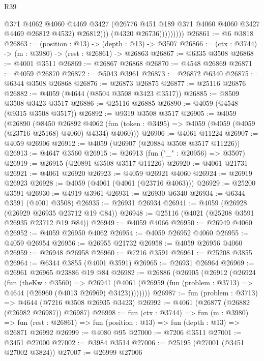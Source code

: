 \begin{lexlean}{R39}
\begin{coremodule}
                          @371
                          @4062
                          @4060
                          @4469
                          @3427
                          (@26776 @451 @189 @371 @4060 @4060 @3427 @4469 @26812 @4532)
                          @26812)))
                    (@4320 @26736)))))))))
@26861 := @6 @3818
@26863 := (position : @13) -> (depth : @13) -> @3507
@26866 := (ctx : @3744) -> (m : @3980) -> (rest : @26861) -> @26863
@26867 := @6335 @3508
@26868 := @4001 @3511
@26869 := @26867 @26868
@26870 := @4548 @26869
@26871 := @4059 @26870
@26872 := @5043 @3961
@26873 := @26872 @6340
@26875 := @6344 @3508 @26868
@26876 := @26873 @26875
@26877 := @25116 @26876
@26882 := @4059 (@4644 (@8504 @3508 @3423 @3517))
@26885 := @8509 @3508 @3423 @3517
@26886 := @25116 @26885
@26890 := @4059 (@4548 (@9315 @3508 @3517))
@26892 := @9319 @3508 @3517
@26905 := @4059
    (@26890
      (@8450
        @26892
        @4062
        (fun (token : @3495) => @4059 (@4059 (@4059 (@23716 @25168) @4060) @4334) @4060)))
@26906 := @4061 @11224
@26907 := @4059 @26906
@26912 := @4059 (@26907 (@20884 @3508 @3517 @11226))
@26913 := @4647 @3560
@26915 := @26913 (fun ("_" : @20956) => @3507)
@26919 := @26915 (@20891 @3508 @3517 @11226)
@26920 := @4061 @21731
@26921 := @4061 @26920
@26923 := @4059 @26921 @4060
@26924 := @26919 @26923
@26928 := @4059 (@4061 (@4061 (@23716 @4063)))
@26929 := @25200 @3591
@26930 := @4919 @3961
@26931 := @26930 @6340
@26934 := @6344 @3591 (@4001 @3508)
@26935 := @26931 @26934
@26941 := @4059 (@26928 (@26929 @26935 @23712 @19 @84))
@26948 := @25116 (@4021 (@25208 @3591 @26935 @23712 @19 @84))
@26949 := @4059 @4066
@26950 := @26949 @4060
@26952 := @4059 @26950 @4062
@26954 := @4059 @26952 @4060
@26955 := @4059 @26954
@26956 := @26955 @21732
@26958 := @4059 @26956 @4060
@26959 := @26948 @26958
@26960 := @7216 @3591
@26961 := @25208 @3855
@26964 := @6344 @3855 (@4001 @3591)
@26965 := @26931 @26964
@26969 := @26961 @26965 @23886 @19 @84
@26982 := @26886
    (@26905
      (@26912
        (@26924
          (fun (theKw : @3560) =>
          @26941 (@4061 (@26959 (fun (problem : @3713) => @4644 (@26960 (@4013 @26969) @3423))))))))
@26987 := fun (problem : @3713) => @4644 (@7216 @3508 @26935 @3423)
@26992 := @4061 (@26877 (@26882 (@26982 @26987)) @26987)
@26998 := fun (ctx : @3744) =>
  fun (m : @3980) =>
  fun (rest : @26861) => fun (position : @13) => fun (depth : @13) => @26871 @26992
@26999 := @4080 @95
@27000 := @7206 @3511
@27001 := @3451 @27000
@27002 := @3984 @3514
@27006 := @25195 (@27001 (@3451 @27002 @3824))
@27007 := @26999 @27006

\end{coremodule}
\end{lexlean}
